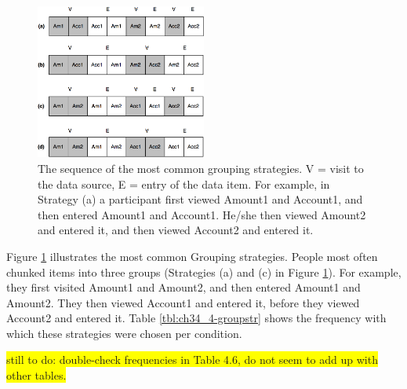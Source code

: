 \begin{figure}[!ht]
  \centering
    \includegraphics[width=0.5\textwidth]{images/ch34/ch34_4-groupstr.png}
      \caption{The sequence of the most common grouping strategies. V = visit to the data source, E = entry of the data item. For example, in Strategy (a) a participant first viewed Amount1 and Account1, and then entered Amount1 and Account1. He/she then viewed Amount2 and entered it, and then viewed Account2 and entered it.}
          \label{fig:ch34_4-groupstr}
\end{figure}

Figure \ref{fig:ch34_4-groupstr} illustrates the most common Grouping strategies. People most often chunked items into three groups (Strategies (a) and (c) in Figure \ref{fig:ch34_4-groupstr}). For example, they first visited Amount1 and Amount2, and then entered Amount1 and Amount2. They then viewed Account1 and entered it, before they viewed Account2 and entered it. Table \ref{tbl:ch34_4-groupstr} shows the frequency with which these strategies were chosen per condition.

 \colorbox{yellow}{still to do: double-check frequencies in Table 4.6, do not seem to add up with other tables.}

